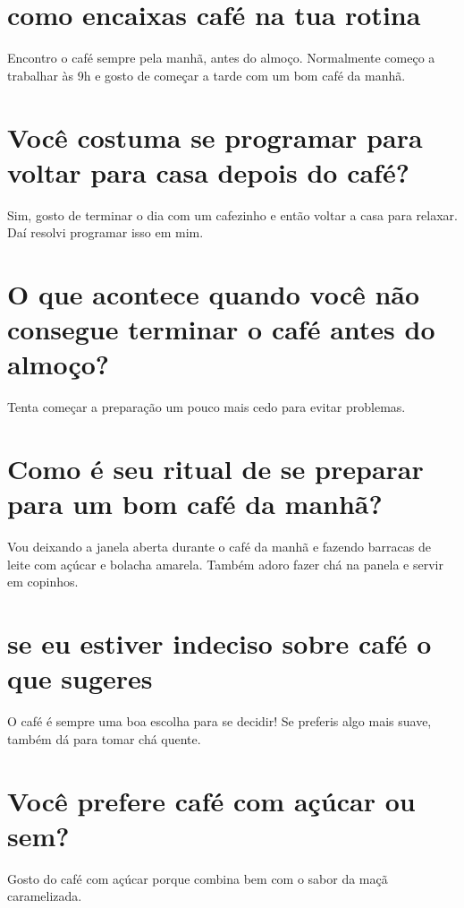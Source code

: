\documentclass[11pt,a4paper]{article}
\begin{document}
\maketitle
\begin{abstract}Exploração do ollama a partir de sementes banais (nível 2). Teoria continua de fora.\end{abstract}
\section{como encaixas café na tua rotina}
Encontro o café sempre pela manhã, antes do almoço. Normalmente começo a trabalhar às 9h e gosto de começar a tarde com um bom café da manhã.

\section{Você costuma se programar para voltar para casa depois do café?}
Sim, gosto de terminar o dia com um cafezinho e então voltar a casa para relaxar. Daí resolvi programar isso em mim.

\section{O que acontece quando você não consegue terminar o café antes do almoço?}
Tenta começar a preparação um pouco mais cedo para evitar problemas.

\section{Como é seu ritual de se preparar para um bom café da manhã?}
Vou deixando a janela aberta durante o café da manhã e fazendo barracas de leite com açúcar e bolacha amarela. Também adoro fazer chá na panela e servir em copinhos.

\section{se eu estiver indeciso sobre café o que sugeres}
O café é sempre uma boa escolha para se decidir! Se preferis algo mais suave, também dá para tomar chá quente.

\section{Você prefere café com açúcar ou sem?}
Gosto do café com açúcar porque combina bem com o sabor da maçã caramelizada.
\end{document}
